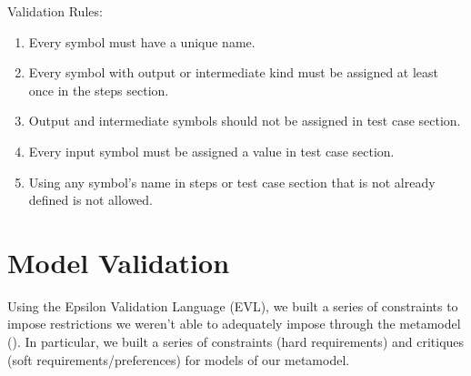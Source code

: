 \documentclass[11pt,fleqn]{article}
\begin{document}
 \noindent{}Validation Rules:
\begin{enumerate}
  \item Every symbol must have a unique name.
  \item Every symbol with output or intermediate kind must be assigned at least once in the steps section. 
  \item Output and intermediate symbols should not be assigned in test case section.
  \item Every input symbol must be assigned a value in test case section.
  \item Using any symbol's name in steps or test case section that is not already defined is not allowed.
  \end{enumerate}
\newpage{}

\section{Model Validation}
\label{sec:model-validation}

Using the Epsilon Validation Language (EVL), we built a series of constraints to
impose restrictions we weren't able to adequately impose through the metamodel
(). In particular, we built a series of
constraints (hard requirements) and critiques (soft requirements/preferences)
for models of our metamodel.
\end{document}
